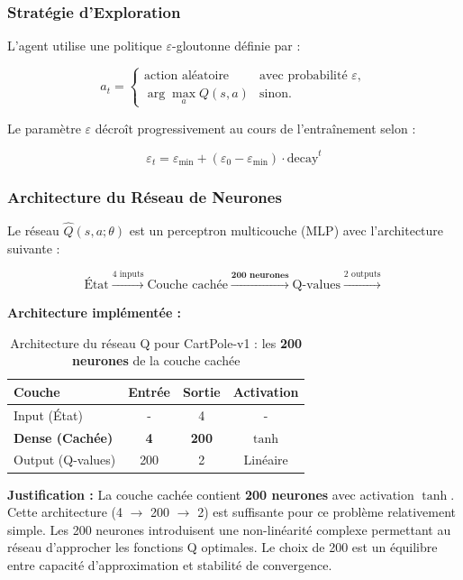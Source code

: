 \subsubsection{Stratégie d'Exploration}

L'agent utilise une politique $\varepsilon$-gloutonne définie par :

\[
a_t =
\begin{cases}
\text{action aléatoire} & \text{avec probabilité } \varepsilon, \\
\arg\max_a Q(s,a) & \text{sinon}.
\end{cases}
\]

Le paramètre $\varepsilon$ décroît progressivement au cours de l'entraînement selon :

\[
\varepsilon_t = \varepsilon_{\min} + (\varepsilon_0 - \varepsilon_{\min}) \cdot \text{decay}^t
\]

\subsubsection{Architecture du Réseau de Neurones}

Le réseau $\hat{Q}(s,a;\theta)$ est un perceptron multicouche (MLP) avec l'architecture suivante :

\[
\text{État} \xrightarrow{4 \text{ inputs}} \text{Couche cachée} \xrightarrow{\textbf{200 neurones}} \text{Q-values} \xrightarrow{2 \text{ outputs}}
\]

\textbf{Architecture implémentée :}

\begin{table}[h!]
    \centering
    \begin{tabular}{|l|c|c|c|}
    \hline
    \textbf{Couche} & \textbf{Entrée} & \textbf{Sortie} & \textbf{Activation} \\
    \hline
    Input (État) & - & 4 & - \\
    \hline
    \textbf{Dense (Cachée)} & \textbf{4} & \textbf{200} & \textbf{$\tanh$} \\
    \hline
    Output (Q-values) & 200 & 2 & Linéaire \\
    \hline
    \end{tabular}
    \caption{Architecture du réseau Q pour CartPole-v1 : les \textbf{200 neurones} de la couche cachée}
\end{table}

\textbf{Justification :} La couche cachée contient \textbf{200 neurones} avec activation $\tanh$. Cette architecture (4 $\to$ 200 $\to$ 2) est suffisante pour ce problème relativement simple. Les 200 neurones introduisent une non-linéarité complexe permettant au réseau d'approcher les fonctions Q optimales. Le choix de 200 est un équilibre entre capacité d'approximation et stabilité de convergence.

